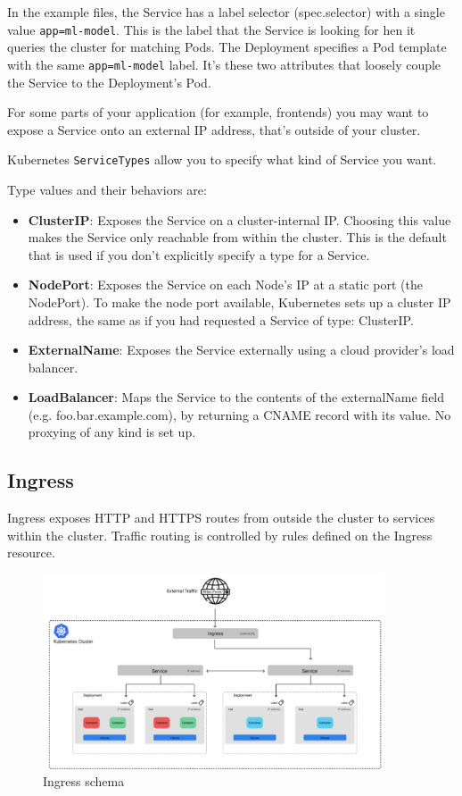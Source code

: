 \documentclass[10pt,a4paper]{report}
\begin{document}
In the example files, the Service has a label selector (spec.selector) with a single value \texttt{app=ml-model}. This is the label that the Service is looking for hen it queries the cluster for matching Pods. The Deployment specifies a Pod template with the same \texttt{app=ml-model} label. It’s these two attributes that loosely couple the Service to the Deployment’s Pod.

For some parts of your application (for example, frontends) you may want to expose a Service onto an external IP address, that's outside of your cluster.

Kubernetes \texttt{ServiceTypes} allow you to specify what kind of Service you want.

Type values and their behaviors are:
\begin{itemize}
	\item \textbf{ClusterIP}: Exposes the Service on a cluster-internal IP. Choosing this value makes the Service only reachable from within the cluster. This is the default that is used if you don't explicitly specify a type for a Service.
	\item \textbf{NodePort}: Exposes the Service on each Node's IP at a static port (the NodePort). To make the node port available, Kubernetes sets up a cluster IP address, the same as if you had requested a Service of type: ClusterIP.
	\item \textbf{ExternalName}: Exposes the Service externally using a cloud provider's load balancer.
	\item \textbf{LoadBalancer}: Maps the Service to the contents of the externalName field (e.g. foo.bar.example.com), by returning a CNAME record with its value. No proxying of any kind is set up.
\end{itemize}
 
\subsection{Ingress}
Ingress exposes HTTP and HTTPS routes from outside the cluster to services within the cluster. Traffic routing is controlled by rules defined on the Ingress resource.


\begin{figure}[h]
	\centering
	\includegraphics[width=0.9\textwidth]{image-ingress-k8s}
	\caption{Ingress schema}
	\label{image-k8s-ingress}
\end{figure} 
\end{document}
